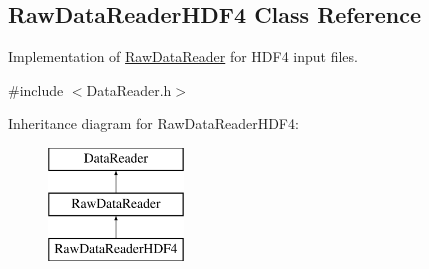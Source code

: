 \hypertarget{classRawDataReaderHDF4}{
\subsection{RawDataReaderHDF4 Class Reference}
\label{classRawDataReaderHDF4}
}


Implementation of \hyperlink{classRawDataReader}{RawDataReader} for HDF4 input files.  




{\ttfamily \#include $<$DataReader.h$>$}

Inheritance diagram for RawDataReaderHDF4:\begin{figure}[H]
\begin{center}
\leavevmode
\includegraphics[height=3.000000cm]{classRawDataReaderHDF4}
\end{center}
\end{figure}

